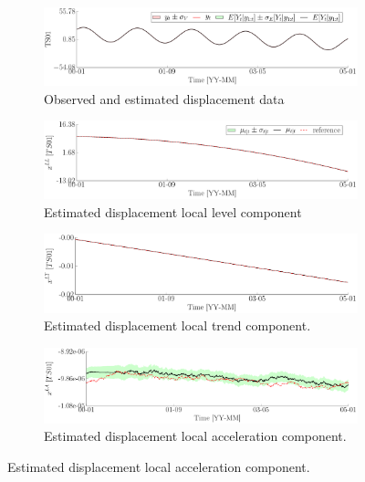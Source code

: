 \begin{figure}[h!]
\centering
\begin{subfigure}{\linewidth}
\includegraphics[width=0.9\linewidth]{./docfigs/Example_SYNTHETIC/optim_param_optim_initialhiddenstate/TS01_ObservedPredicted.pdf}
\caption{Observed and estimated displacement data}
\end{subfigure}
\begin{subfigure}{\linewidth}
\includegraphics[width=0.9\linewidth]{./docfigs/Example_SYNTHETIC/optim_param_optim_initialhiddenstate/TS01_LL_1.pdf} 
\caption{Estimated displacement local level component}
\end{subfigure}
\begin{subfigure}{\linewidth}
\includegraphics[width=0.9\linewidth]{./docfigs/Example_SYNTHETIC/optim_param_optim_initialhiddenstate/TS01_LT_2.pdf}
\caption{Estimated displacement local trend component.}
\end{subfigure}
\begin{subfigure}{\linewidth}
\includegraphics[width=0.9\linewidth]{./docfigs/Example_SYNTHETIC/optim_param_optim_initialhiddenstate/TS01_LA_3.pdf}
\caption{Estimated displacement local acceleration component.}
\end{subfigure}
\end{figure}
